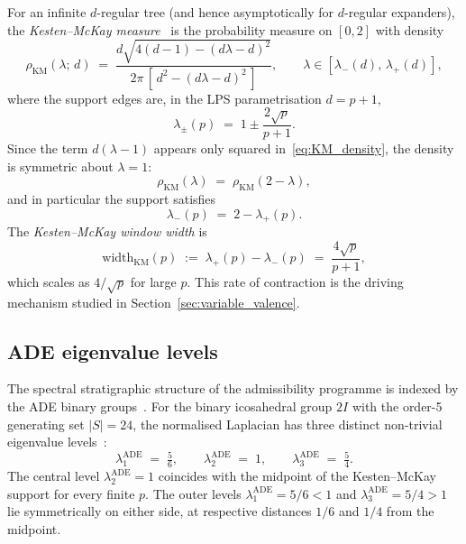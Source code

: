 \documentclass[11pt]{article}
\newcommand{\lADE}[1]{\lambda_{#1}^{\mathrm{ADE}}}
\newcommand{\widthKM}{\mathrm{width}_{\mathrm{KM}}}
\newcommand{\rKM}{\rho_{\mathrm{KM}}}
\begin{document}
      For an infinite $d$-regular tree (and hence asymptotically for $d$-regular
      expanders), the \emph{Kesten--McKay measure}~\cite{McKay,Kesten} is the
      probability measure on $[0,2]$ with density
      \begin{equation}
        \rKM(\lambda;\,d) \;=\;
        \frac{d\sqrt{4(d-1) - (d\lambda - d)^2}}{2\pi\,[\,d^2 - (d\lambda - d)^2\,]},
        \qquad \lambda \in [\lambda_-(d),\,\lambda_+(d)],
        \label{eq:KM_density}
      \end{equation}
      where the support edges are, in the LPS parametrisation $d = p+1$,
      \begin{equation}
        \lambda_\pm(p) \;=\; 1 \pm \frac{2\sqrt{p}}{p+1}.
        \label{eq:KM_support_p}
      \end{equation}
      Since the term $d(\lambda - 1)$ appears only squared in~\eqref{eq:KM_density},
      the density is symmetric about $\lambda = 1$:
      \begin{equation}
        \rKM(\lambda) \;=\; \rKM(2 - \lambda),
        \label{eq:KM_symmetry}
      \end{equation}
      and in particular the support satisfies
      \begin{equation}
        \lambda_-(p) \;=\; 2 - \lambda_+(p).
        \label{eq:support_symmetry}
      \end{equation}
      The \emph{Kesten--McKay window width} is
      \begin{equation}
        \widthKM(p) \;:=\; \lambda_+(p) - \lambda_-(p) \;=\; \frac{4\sqrt{p}}{p+1},
        \label{eq:KM_width}
      \end{equation}
      which scales as $4/\sqrt{p}$ for large $p$.
      This rate of contraction is the driving mechanism studied in
      Section~\ref{sec:variable_valence}.

    \subsection{ADE eigenvalue levels}
      \label{subsec:ADE}

      The spectral stratigraphic structure of the admissibility programme is indexed
      by the ADE binary groups~\cite{Beau2026a4}.
      For the binary icosahedral group $2I$ with the order-5 generating set
      $|S| = 24$, the normalised Laplacian has three distinct non-trivial eigenvalue
      levels~\cite{Beau2026a5}:
      \begin{equation}
        \lADE{1} \;=\; \tfrac{5}{6}, \qquad
        \lADE{2} \;=\; 1, \qquad
        \lADE{3} \;=\; \tfrac{5}{4}.
        \label{eq:ADE_levels}
      \end{equation}
      The central level $\lADE{2} = 1$ coincides with the midpoint of the
      Kesten--McKay support for every finite $p$.
      The outer levels $\lADE{1} = 5/6 < 1$ and $\lADE{3} = 5/4 > 1$ lie
      symmetrically on either side, at respective distances $1/6$ and $1/4$ from
      the midpoint.
\end{document}

